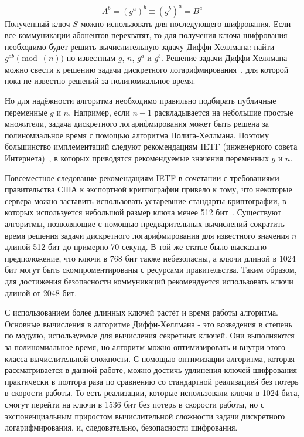 \documentclass[times,specification,annotation]{itmo-student-thesis}
\begin{document}
\[A^b = (g^a)^b \equiv (g^b)^a = B^a\]
Полученный ключ $S$ можно использовать для последующего шифрования.
Если все коммуникации абонентов перехватят, то для получения ключа шифрования необходимо будет решить
вычислительную задачу Диффи-Хеллмана: найти $g^{ab}\pmod(n)$ по известным $g$, $n$, $g^a$ и $g^b$.
Решение задачи Диффи-Хеллмана можно свести к решению задачи дискретного логарифмирования~\cite{sma15},
для которой пока не известно решений за полиномиальное время.\par
Но для надёжности алгоритма необходимо правильно подбирать публичные переменные $g$ и $n$.
Например, если $n-1$ раскладывается на небольшие простые множители, задача дискретного логарифмирования
может быть решена за полиномиальное время с помощью алгоритма Полига-Хеллмана.
Поэтому большинство имплементаций следуют рекомендациям IETF (инженерного совета Интернета)~\cite{rfc7296}, в которых
приводятся рекомендуемые значения переменных $g$ и $n$.\par
Повсеместное следование рекомендациям IETF в сочетании с требованиями правительства США к экспортной криптографии
привело к тому, что некоторые сервера можно заставить использовать устаревшие стандарты криптографии, в которых
используется небольшой размер ключа менее 512 бит~\cite{adr15}.
Существуют алгоритмы, позволяющие с помощью предварительных вычислений сократить время решения задачи
дискретного логарифмирования для известного значения $n$ длиной 512 бит до примерно 70 секунд.
В той же статье было высказано предположение, что ключи в 768 бит также небезопасны, а ключи длиной
в 1024 бит могут быть скомпроментированы с ресурсами правительства.
Таким образом, для достижения безопасности коммуникаций рекомендуется использовать ключи длиной от 2048 бит.\par
С использованием более длинных ключей растёт и время работы алгоритма.
Основные вычисления в алгоритме Диффи-Хеллмана - это возведения в степень по модулю, используемые для вычисления секретных ключей.
Они выполняются за полиномиальное время, но алгоритм можно оптимизировать и внутри этого класса вычислительной сложности.
С помощью оптимизации алгоритма, которая рассматривается в данной работе, можно достичь удлинения ключей шифрования
практически в полтора раза по сравнению со стандартной реализацией без потерь в скорости работы.
То есть реализации, которые использовали ключи в 1024 бита, смогут перейти на ключи в 1536 бит без потерь в скорости работы,
но с экспоненциальным приростом вычислительной сложности задачи дискретного логарифмирования, и, следовательно, безопасности
шифрования.
\end{document}
